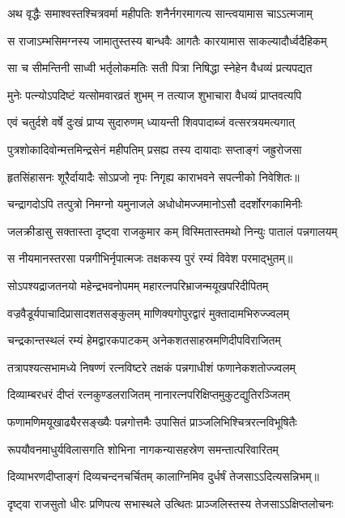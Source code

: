 \twolineshloka
{अथ वृद्धैः समाश्वस्तश्चित्रवर्मा महीपतिः}
{शनैर्नगरमागत्य सान्त्वयामास चाऽऽत्मजाम्} %

\twolineshloka
{स राजाऽम्भसिमग्नस्य जामातुस्तस्य बान्धवैः}
{आगतैः कारयामास साकल्यादौर्ध्वदैहिकम्} %

\twolineshloka
{सा च सीमन्तिनी साध्वी भर्तृलोकमतिः सती}
{पित्रा निषिद्धा स्नेहेन वैधव्यं प्रत्यपद्यत} %

\twolineshloka
{मुनेः पत्न्योऽपदिष्टं यत्सोमवारव्रतं शुभम्}
{न तत्याज शुभाचारा वैधव्यं प्राप्तवत्यपि} %

\twolineshloka
{एवं चतुर्दशे वर्षे दुःखं प्राप्य सुदारुणम्}
{ध्यायन्ती शिवपादाब्जं वत्सरत्रयमत्यगात्} %

\twolineshloka
{पुत्रशोकादिवोन्मत्तमिन्द्रसेनं महीपतिम्}
{प्रसह्य तस्य दायादाः सप्ताङ्गं जह्रुरोजसा} %

\twolineshloka
{हृतसिंहासनः शूरैर्दायादैः सोऽप्रजो नृपः}
{निगृह्य काराभवने सपत्नीको निवेशितः॥} %

\twolineshloka
{चन्द्रागदोऽपि तत्पुत्रो निमग्नो यमुनाजले}
{अधोधोमज्जमानोऽसौ ददर्शोरगकामिनीः} %

\twolineshloka
{जलक्रीडासु सक्तास्ता दृष्ट्वा राजकुमार कम्}
{विस्मितास्तमथो निन्युः पातालं पन्नगालयम्} %

\twolineshloka
{स नीयमानस्तरसा पन्नगीभिर्नृपात्मजः}
{तक्षकस्य पुरं रम्यं विवेश परमाद्भुतम्॥} %

\twolineshloka
{सोऽपश्यद्राजतनयो महेन्द्रभवनोपमम्}
{महारत्नपरिभ्राजन्मयूखपरिदीपितम्} %

\twolineshloka
{वज्रवैडूर्यपाचादिप्रासादशतसङ्कुलम्}
{माणिक्यगोपुरद्वारं मुक्तादामभिरुज्ज्वलम्} %

\twolineshloka
{चन्द्रकान्तस्थलं रम्यं हेमद्वारकपाटकम्}
{अनेकशतसाहस्रमणिदीपविराजितम्} %

\twolineshloka
{तत्रापश्यत्सभामध्ये निषण्णं रत्नविष्टरे}
{तक्षकं पन्नगाधीशं फणानेकशतोज्ज्वलम्} %

\twolineshloka
{दिव्याम्बरधरं दीप्तं रत्नकुण्डलराजितम्}
{नानारत्नपरिक्षिप्तमुकुटद्युतिरञ्जितम्} %

\twolineshloka
{फणामणिमयूखाढ्यैरसङ्ख्यैः पन्नगोत्तमैः}
{उपासितं प्राञ्जलिभिश्चित्ररत्नविभूषितैः} %

\twolineshloka
{रूपयौवनमाधुर्यविलासगति शोभिना}
{नागकन्यासहस्रेण समन्तात्परिवारितम्} %

\twolineshloka
{दिव्याभरणदीप्ताङ्गं दिव्यचन्दनचर्चितम्}
{कालाग्निमिव दुर्धर्षं तेजसाऽऽदित्यसन्निभम्॥} %

\twolineshloka
{दृष्ट्वा राजसुतो धीरः प्रणिपत्य सभास्थले}
{उत्थितः प्राञ्जलिस्तस्य तेजसाऽऽक्षिप्तलोचनः} %

